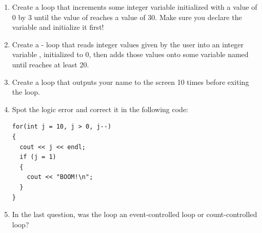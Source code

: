 \begin{enumerate}
\item Create a  loop that increments some integer variable  initialized with a value of 0 by 3 until the value of  reaches a value of 30.
Make sure you declare the variable and initialize it first! 

\item  Create a - loop that reads integer values given by the user into an integer variable , initialized to 0, then adds those values onto some variable named  until  reaches at least 20.

\item Create a  loop that outputs your name to the screen 10 times before exiting the loop.

\item Spot the logic error and correct it in the following code:

\noindent\begin{minipage}{\linewidth}\begin{lstlisting}
for(int j = 10, j > 0, j--)
{
  cout << j << endl;
  if (j = 1)
  {
    cout << "BOOM!\n";
  }
}
\end{lstlisting}\end{minipage}

\item In the last question, was the loop an event-controlled loop or count-controlled loop?
\end{enumerate}

